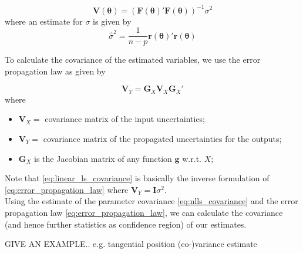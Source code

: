 \begin{equation}
\label{eq:nlls_covariance}
\mathbf{V}(\boldsymbol{\theta}) = (\mathbf{F}(\boldsymbol{\theta})'\mathbf{F}(\boldsymbol{\theta})) ^{-1} \sigma^2
\end{equation}
where an estimate for $\sigma$ is given by
\begin{equation}
\hat{\sigma}^2 = \frac{1}{n-p} \mathbf{r}(\boldsymbol{\theta})' \mathbf{r}(\boldsymbol{\theta})
\end{equation}

To calculate the covariance of the estimated variables, we use the error propagation law as given by \citet[eq. 4.15]{Siegwart}

\begin{equation}
\label{eq:error_propagation_law}
\mathbf{V}_Y = \mathbf{G}_X \mathbf{V}_X \mathbf{G}_X'
\end{equation}
where
\begin{itemize}
\item[] $\mathbf{V}_X =$ covariance matrix of the input uncertainties;
\item[] $\mathbf{V}_Y =$ covariance matrix of the propagated uncertainties for the outputs;
\item[] $\mathbf{G}_X  $ is the Jacobian matrix of any function $\mathbf{g}$ w.r.t. $X$;
\end{itemize}

Note that \eqref{eq:linear_ls_covariance} is basically the inverse formulation of \eqref{eq:error_propagation_law} where $\mathbf{V}_Y = \mathbf{I} \sigma^2$.
\\

Using the estimate of the parameter covariance \eqref{eq:nlls_covariance} and the error propagation law \eqref{eq:error_propagation_law}, we can calculate the covariance (and hence further statistics as confidence region) of our estimates.

GIVE AN EXAMPLE.. e.g. tangential position (co-)variance estimate

